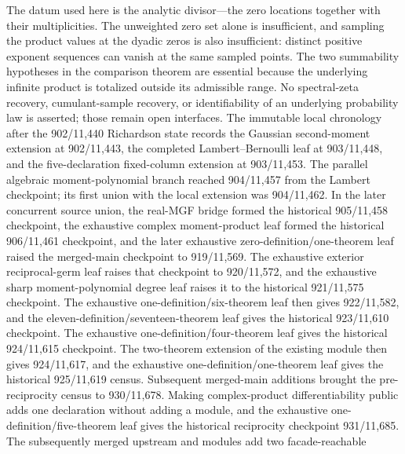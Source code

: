 \documentclass[11pt,oneside]{article}
\theoremstyle{definition}
\theoremstyle{remark}
\begin{document}
The datum used here is the analytic divisor---the zero locations together
with their multiplicities.  The unweighted zero set alone is insufficient,
and sampling the product values at the dyadic zeros is also insufficient:
distinct positive exponent sequences can vanish at the same sampled points.
The two summability hypotheses in the comparison theorem are essential
because the underlying infinite product is totalized outside its admissible
range.  No spectral-zeta recovery, cumulant-sample recovery, or
identifiability of an underlying probability law is asserted; those remain
open interfaces.  The immutable local chronology after the 902/11,440
Richardson state records the Gaussian second-moment extension at 902/11,443,
the completed Lambert--Bernoulli leaf at 903/11,448, and the five-declaration
 fixed-column extension at 903/11,453.
The parallel algebraic moment-polynomial branch reached 904/11,457 from the
Lambert checkpoint; its first union with the local extension was 904/11,462.
In the later concurrent source union, the real-MGF bridge
formed the historical 905/11,458 checkpoint, the exhaustive complex
moment-product leaf formed the historical 906/11,461 checkpoint, and the
later exhaustive zero-definition/one-theorem
 leaf raised the merged-main checkpoint
to 919/11,569.  The exhaustive exterior reciprocal-germ leaf raises that
checkpoint to 920/11,572, and the exhaustive sharp moment-polynomial degree
leaf raises it to the historical 921/11,575 checkpoint.  The exhaustive
one-definition/six-theorem  leaf then gives
922/11,582, and the eleven-definition/seventeen-theorem
 leaf gives the historical 923/11,610
checkpoint.  The exhaustive one-definition/four-theorem
 leaf gives the historical
924/11,615 checkpoint.  The two-theorem extension of the existing
 module then gives 924/11,617, and the
exhaustive one-definition/one-theorem
 leaf gives the historical
925/11,619 census.  Subsequent merged-main additions brought the
pre-reciprocity census to 930/11,678.  Making complex-product
differentiability public adds one declaration without adding a module, and
the exhaustive one-definition/five-theorem
 leaf gives the historical
reciprocity checkpoint 931/11,685.  The subsequently merged upstream
 and
 modules add two facade-reachable
\end{document}
